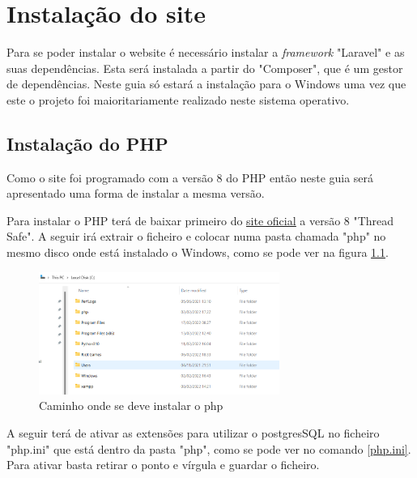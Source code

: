 \documentclass[11pt, twoside]{report}
\begin{document}
	\newpage
	\setcounter{page}{1} %
	\tableofcontents %
	\thispagestyle{plain} %
	\thispagestyle{empty} %
	\newpage
	\listoftables %
	\newpage
	\listoffigures %
	\newpage
	\listoflistings
	
	\newpage
	
	
	\chapter{Instalação do site}
		Para se poder instalar o website é necessário instalar a \textit{framework} "Laravel" e as suas dependências. Esta será instalada a partir do "Composer", que é um gestor de dependências. Neste guia só estará a instalação para o Windows uma vez que este o projeto foi maioritariamente realizado neste sistema operativo.
	
	\section{Instalação do PHP}
	Como o site foi programado com a versão 8 do PHP então neste guia será apresentado uma forma de instalar a mesma versão.
	
	
	Para instalar o PHP terá de baixar primeiro do \href{https://windows.php.net/download#php-7.4}{\underline{site oficial}}  a versão 8 "Thread Safe". A seguir irá extrair o ficheiro e colocar numa pasta chamada "php" no mesmo disco onde está instalado o Windows, como se pode ver na figura \ref{phppath}.
	
	\begin{figure}[H] 
		\centering 
		\includegraphics[width=0.7\textwidth,height=0.7\textheight,keepaspectratio]{images/root}
		\caption{Caminho onde se deve instalar o php}
		\label{phppath}
	\end{figure}

	A seguir terá de ativar as extensões para utilizar o postgresSQL no ficheiro "php.ini" que está dentro da pasta "php", como se pode ver no comando \ref{php.ini}. Para ativar basta retirar o ponto e vírgula e guardar o ficheiro.
	
\end{document}
